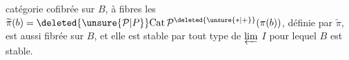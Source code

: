 catégorie cofibrée sur $B$, à fibres les $\widetilde\pi(b)=\deleted{\unsure{\mathcal P|P}}\mathrm{Cat}\,\mathcal P^{\deleted{\unsure{*|+}}}(\pi(b))$, définie par $\widetilde\pi$, est aussi fibrée sur $B$,  et elle est stable par tout type de $\varprojlim$   $I$  pour lequel $B$  est stable.
